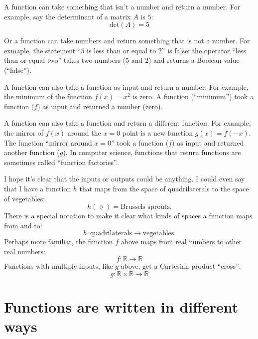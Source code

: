 A function can take something that isn't a number and return a number. For
example, say the determinant of a matrix $A$ is $5$:
\begin{equation*}
\mathrm{det}(A) = 5
\end{equation*}

Or a function can take numbers and return something that is not a number. For
exmaple, the statement ``$5$ is less than or equal to $2$'' is false: the
operator ``less than or equal two'' takes two numbers ($5$ and $2$) and returns
a Boolean value (``false'').

A function can also take a function as input and return a number. For example,
the minimum of the function $f(x) = x^2$ is zero. A function (``minimum'') took
a function ($f$) as input and returned a number (zero).

A function can also take a function and return a different function. For
example, the mirror of $f(x)$ around the $x=0$ point is a new function $g(x) =
f(-x)$. The function ``mirror around $x=0$'' took a function ($f$) as input and
returned another function ($g$). In computer science, functions that return
functions are sometimes called ``function factories''.

I hope it's clear that the inputs or outputs could be anything. I could even
say that I have a function $h$ that maps from the space of quadrilaterals to
the space of vegetables:
\begin{equation*}
h(\lozenge) = \text{Brussels sprouts}.
\end{equation*}
There is a special notation to make it clear what kinds of spaces a function
maps from and to:
\begin{equation*}
h : \text{quadrilaterals} \to \text{vegetables}.
\end{equation*}
Perhaps more familiar, the function $f$ above maps from real numbers to other
real numbers:
\begin{equation*}
f : \mathbb{R} \to \mathbb{R}
\end{equation*}
Functions with multiple inputs, like $g$ above, get a Cartesian product
``cross'':
\begin{equation*}
g : \mathbb{R} \times \mathbb{R} \to \mathbb{R}
\end{equation*}



\section{Functions are written in different ways}

